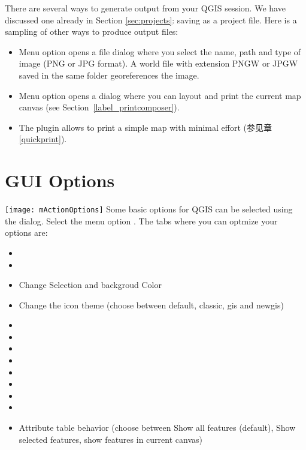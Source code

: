There are several ways to generate output from your QGIS session. We have
discussed one already in Section \ref{sec:projects}: saving as a project file.
Here is a sampling of other ways to produce output files:

\begin{itemize}
\item Menu option  opens
a file dialog where you select the name, path and type of image (PNG or JPG
format). A world file with extension PNGW or JPGW saved in the same folder
georeferences the image.
\item Menu option  opens a
dialog where you can layout and print the current map canvas (see
Section~\ref{label_printcomposer}).
\item The  plugin allows
to print a simple map with minimal effort (参见章 \ref{quickprint}).
\end{itemize}

\section{GUI Options}\label{subsec:gui_options}

\texttt{[image: mActionOptions]} Some basic options
for QGIS can be selected using the  dialog. Select the
menu option  \arrow
{}. The tabs where you can
optmize your options are:


\begin{itemize}
\item {}
\item {}
\item Change Selection and backgroud Color
\item Change the icon theme (choose between default, classic, gis and newgis)
\item {}
\item {}
\item {}
\item {}
\item {}
\item {}
\item {}
\item {}
\item Attribute table behavior (choose between Show all features (default), Show selected features,
show features in current canvas)
\end{itemize}

